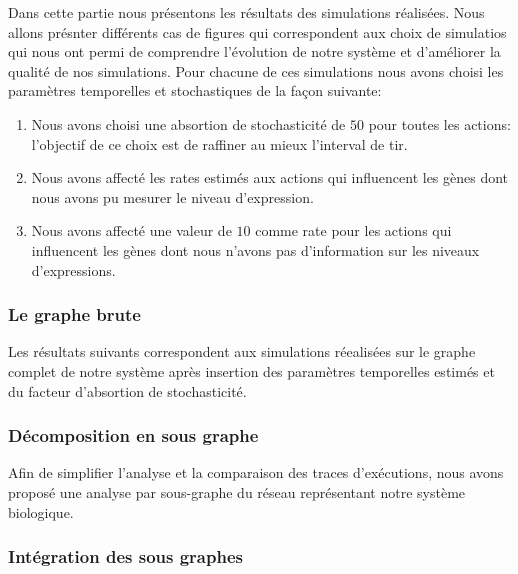 \documentclass[11pt,a4paper,twoside]{epig}
\begin{document}
Dans cette partie nous présentons les résultats des simulations réalisées. Nous allons présnter différents cas de figures qui correspondent 
aux choix de simulatios qui nous ont permi de comprendre l'évolution de notre système et d'améliorer la qualité de nos simulations. Pour chacune de ces 
simulations nous avons choisi les paramètres temporelles et stochastiques de la façon suivante:
\begin{enumerate}
 \item Nous avons choisi une absortion de stochasticité de $50$ pour toutes les actions: l'objectif de ce choix est de raffiner au mieux l'interval de tir.
 \item Nous avons affecté les rates estimés aux actions qui influencent les gènes dont nous avons pu mesurer le niveau d'expression.
 \item Nous avons affecté une valeur de $10$ comme rate pour les actions qui influencent les gènes dont nous n'avons pas d'information sur les niveaux d'expressions. 
\end{enumerate}


\subsubsection{Le graphe brute}
Les résultats suivants correspondent aux simulations réealisées sur le graphe complet de notre système après insertion des paramètres temporelles estimés 
et du facteur d'absortion de stochasticité. 


\subsubsection{Décomposition en sous graphe}
Afin de simplifier l'analyse et la comparaison des traces d'exécutions, nous avons proposé une analyse par sous-graphe du réseau représentant notre système 
biologique. 








\subsubsection{Intégration des sous graphes}
\end{document}
